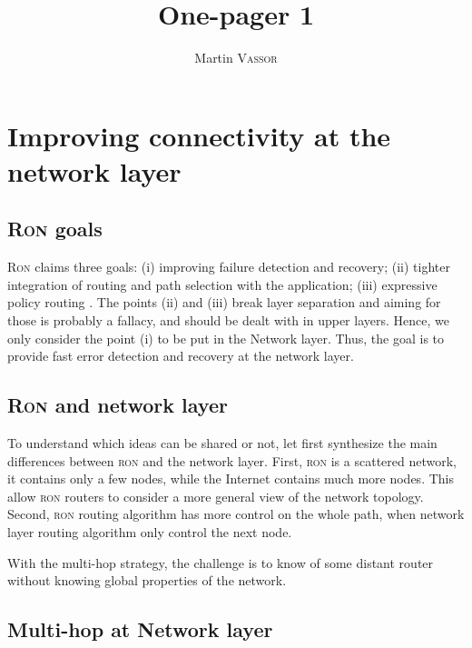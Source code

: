 \documentclass[twocolumn]{article}
\title{One-pager 1}
\author{Martin \textsc{Vassor}}
\date{}
\begin{document}
\maketitle
\section{Improving connectivity at the network layer}
\subsection{\textsc{Ron} goals}
\textsc{Ron} claims three goals: (i) improving failure detection and recovery; (ii) tighter integration of routing and path selection with the application; (iii) expressive policy routing \cite{andersen_resilient_2001}. The points (ii) and (iii) break layer separation and aiming for those is probably a fallacy, and should be dealt with in upper layers. Hence, we only consider the point (i) to be put in the Network layer. Thus, the goal is to provide fast error detection and recovery at the network layer.

\subsection{\textsc{Ron} and network layer}
To understand which ideas can be shared or not, let first synthesize the main differences between \textsc{ron} and the network layer. First, \textsc{ron} is a scattered network, it contains only a few nodes, while the Internet contains much more nodes. This allow \textsc{ron} routers to consider a more general view of the network topology. Second, \textsc{ron} routing algorithm has more control on the whole path, when network layer routing algorithm only control the next node. 

With the multi-hop strategy, the challenge is to know of some distant router without knowing global properties of the network.

\subsection{Multi-hop at Network layer}
\end{document}
